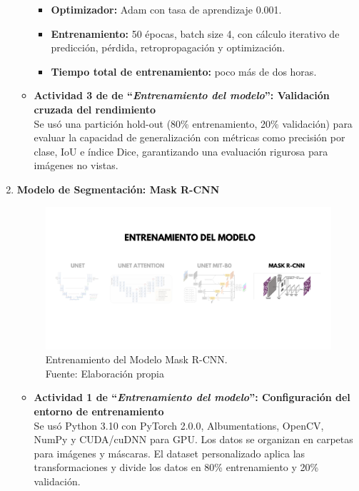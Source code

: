 \begin{enumerate}
\begin{itemize}
\begin{itemize}
\item \textbf{Optimizador:} Adam con tasa de aprendizaje 0.001.

\item \textbf{Entrenamiento:} 50 épocas, batch size 4, con cálculo iterativo de predicción, pérdida, retropropagación y optimización.

\item \textbf{Tiempo total de entrenamiento:} poco más de dos horas.

  \end{itemize}
  

  \item\textbf{Actividad 3 de de “\textit{Entrenamiento del modelo}”: Validación cruzada del rendimiento}
 \\ 
  Se usó una partición hold-out (80\% entrenamiento, 20\% validación) para evaluar la capacidad de generalización con métricas como precisión por clase, IoU e índice Dice, garantizando una evaluación rigurosa para imágenes no vistas.

  \end{itemize}
\newpage
\item \textbf{Modelo de Segmentación: Mask R-CNN}
\begin{figure}[H]
	\begin{center}
		\includegraphics[width=1\textwidth]{4/figures/entrmask.png}
		\caption[Entrenamiento del Modelo Mask R-CNN]{Entrenamiento del Modelo Mask R-CNN.\\
		Fuente: Elaboración propia}
		\label{4:figentmask}
	\end{center}
\end{figure}
  \begin{itemize}
    \item \textbf{Actividad 1 de “\textit{Entrenamiento del modelo}”: Configuración del entorno de entrenamiento}
  \\ 
    Se usó Python 3.10 con PyTorch 2.0.0, Albumentations, OpenCV, NumPy y CUDA/cuDNN para GPU. Los datos se organizan en carpetas para imágenes y máscaras. El dataset personalizado aplica las transformaciones y divide los datos en 80\% entrenamiento y 20\% validación.



\end{itemize}
\end{enumerate}
